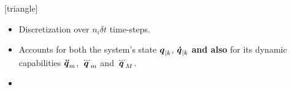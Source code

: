 \begin{frame}
{[triangle]
\begin{itemize}
\addtolength{\itemindent}{3mm}
\item Discretization over {\color{blue} $n_i \delta t$} time-steps. 
\setlength\itemsep{-0.1em} 
\item Accounts for both the system's state $\mbox{\boldmath${q}$}_{|k}$, $\mbox{\boldmath${\dot{q}}$}_{|k}$ \textbf{{\color{ao(english)}and also}} for its dynamic capabilities {\color{blue-violet}$\mbox{\boldmath${\ddot{q}}$}_{m}$}, {\color{blue-violet}$\mbox{\boldmath${\dddot{q}}$}_{m}$} and {\color{blue-violet}$\mbox{\boldmath${\dddot{q}}$}_{M}$}.
\end{itemize}
\vspace{0mm}
\begin{itemize}
\addtolength{\itemindent}{-1mm}
\item[\hookrightarrow] 
\end{itemize}
}


\end{frame}













